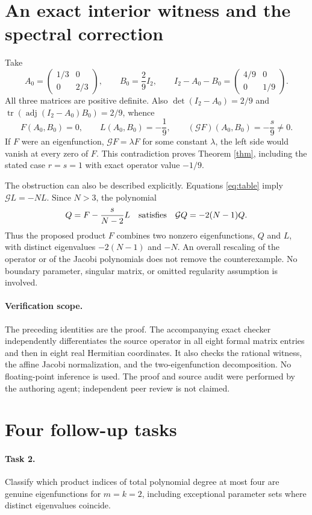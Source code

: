 \documentclass[11pt]{article}
\newcommand{\tr}{\operatorname{tr}}
\newcommand{\adj}{\operatorname{adj}}
\newcommand{\G}{\mathcal G}
\begin{document}
\section*{An exact interior witness and the spectral correction}
Take
\[
 A_0=\begin{pmatrix}1/3&0\\0&2/3\end{pmatrix},\qquad
 B_0=\frac29 I_2,\qquad
 I_2-A_0-B_0=\begin{pmatrix}4/9&0\\0&1/9\end{pmatrix}.
\]
All three matrices are positive definite. Also
$\det(I_2-A_0)=2/9$ and
$\tr(\adj(I_2-A_0)B_0)=2/9$, whence
\[
 F(A_0,B_0)=0,\qquad L(A_0,B_0)=-\frac19,\qquad
 (\G F)(A_0,B_0)=-\frac{s}{9}\ne0.
\]
If $F$ were an eigenfunction, $\G F=\lambda F$ for some constant
$\lambda$, the left side would vanish at every zero of $F$.
This contradiction proves Theorem \ref{thm}, including the stated
case $r=s=1$ with exact operator value $-1/9$.

The obstruction can also be described explicitly. Equations
\eqref{eq:table} imply $\G L=-NL$. Since $N>3$, the polynomial
\[
 Q=F-\frac{s}{N-2}L
 \quad\hbox{satisfies}\quad \G Q=-2(N-1)Q.
\]
Thus the proposed product $F$ combines two nonzero eigenfunctions,
$Q$ and $L$, with distinct eigenvalues $-2(N-1)$ and $-N$.
An overall rescaling of the operator or of the Jacobi polynomials
does not remove the counterexample. No boundary parameter, singular
matrix, or omitted regularity assumption is involved.

\paragraph{Verification scope.}
The preceding identities are the proof. The accompanying exact checker
independently differentiates the source operator in all eight formal
matrix entries and then in eight real Hermitian coordinates. It also
checks the rational witness, the affine Jacobi normalization, and the
two-eigenfunction decomposition. No floating-point inference is used.
The proof and source audit were performed by the authoring agent;
independent peer review is not claimed.

\section*{Four follow-up tasks}
\paragraph{Task 2.}
Classify which product indices of total polynomial degree at most four
are genuine eigenfunctions for $m=k=2$, including exceptional parameter
sets where distinct eigenvalues coincide.
\end{document}
